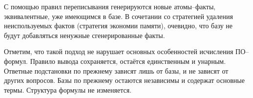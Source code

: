 С помощью правил переписывания генерируются новые атомы--факты, эквивалентные, уже имеющимся в базе. В сочетании со стратегией удаления неиспользуемых фактов (стратегия экономии памяти), очевидно, что базу не будут добавляться ненужные сгенерированные факты.

Отметим, что такой подход не нарушает основных особенностей исчисления ПО--формул. Правило вывода сохраняется, остаётся единственным и унарным. Ответные подстановки по прежнему зависят лишь от базы, и не зависят от других вопросов. Базы по прежнему остаются независимы и содержат основные термы. Структура формулы не изменяется.









